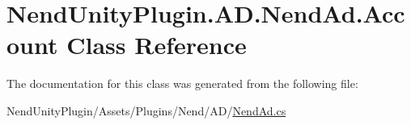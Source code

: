 \hypertarget{class_nend_unity_plugin_1_1_a_d_1_1_nend_ad_1_1_account}{}\section{Nend\+Unity\+Plugin.\+A\+D.\+Nend\+Ad.\+Account Class Reference}
\label{class_nend_unity_plugin_1_1_a_d_1_1_nend_ad_1_1_account}


The documentation for this class was generated from the following file\+:\begin{DoxyCompactItemize}
\item 
Nend\+Unity\+Plugin/\+Assets/\+Plugins/\+Nend/\+A\+D/\hyperlink{_nend_ad_8cs}{Nend\+Ad.\+cs}\end{DoxyCompactItemize}
